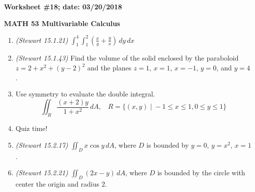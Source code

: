\documentclass{article}
\begin{document}
{\bf Worksheet \#18; date: 03/20/2018}

{\bf MATH 53 Multivariable Calculus}

\begin{enumerate}
\item {\em (Stewart 15.1.21)} $\displaystyle \int_1^4 \int_1^2 \left(\frac{x}{y} + \frac{y}{x}\right) \,dy \,dx$

\item {\em (Stewart 15.1.43)} Find the volume of the solid enclosed by the paraboloid $z = 2 + x^2 + (y - 2)^2$ and the planes $z = 1$, $x = 1$, $x = -1$, $y = 0$, and $y = 4$.

\item Use symmetry to evaluate the double integral.
\[
\iint_R \frac{(x + 2)y}{1 + x^2} \,dA, ~~~~ R = \{(x, y) \;|\; -1 \le x \le 1, 0 \le y \le 1\}
\]

\item Quiz time!

\item {\em (Stewart 15.2.17)} $\displaystyle \iint_D x \cos y \,dA$, where $D$ is bounded by $y = 0$, $y = x^2$, $x = 1$.

\item {\em (Stewart 15.2.21)} $\displaystyle \iint_D (2x - y) \,dA$, where $D$ is bounded by the circle with center the origin and radius $2$.
\end{enumerate}
\end{document}
